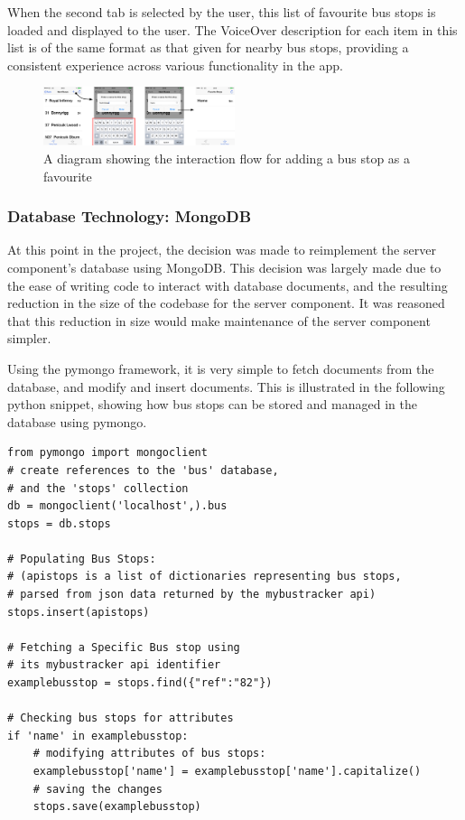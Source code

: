 \documentclass[10pt,twocolumn]{article}
\begin{document}
When the second tab is selected by the user, this list of favourite bus stops is loaded and displayed to the user. The VoiceOver description for each item in this list is of the same format as that given for nearby bus stops, providing a consistent experience across various functionality in the app. 

\begin{figure}[htbp]
  \centering
    \includegraphics[width=0.5\textwidth]{favFlow}
    \caption{A diagram showing the interaction flow for adding a bus stop as a favourite}
\end{figure}

\subsubsection{Database Technology: MongoDB}
At this point in the project, the decision was made to reimplement the server component's database using MongoDB. This decision was largely made due to the ease of writing code to interact with database documents, and the resulting reduction in the size of the codebase for the server component. It was reasoned that this reduction in size would make maintenance of the server component simpler.

Using the pymongo framework, it is very simple to fetch documents from the database, and modify and insert documents. This is illustrated in the following python snippet, showing how bus stops can be stored and managed in the database using pymongo.

\begin{lstlisting}[columns=space-flexible]
from pymongo import mongoclient
# create references to the 'bus' database,
# and the 'stops' collection
db = mongoclient('localhost',).bus
stops = db.stops

# Populating Bus Stops:
# (apistops is a list of dictionaries representing bus stops,
# parsed from json data returned by the mybustracker api)
stops.insert(apistops)

# Fetching a Specific Bus stop using
# its mybustracker api identifier
examplebusstop = stops.find({"ref":"82"})

# Checking bus stops for attributes
if 'name' in examplebusstop:
    # modifying attributes of bus stops:
    examplebusstop['name'] = examplebusstop['name'].capitalize()
    # saving the changes
    stops.save(examplebusstop)
\end{lstlisting}
\end{document}
